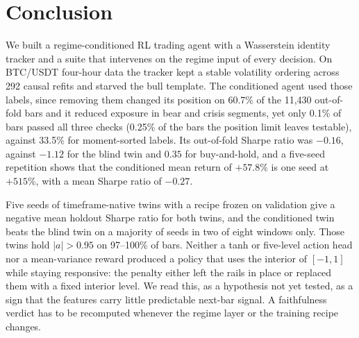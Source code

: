 \documentclass[conference]{IEEEtran}
\begin{document}
\section{Conclusion}
We built a regime-conditioned RL trading agent with a Wasserstein identity tracker and a suite that intervenes on the regime input of every decision. On BTC/USDT four-hour data the tracker kept a stable volatility ordering across 292 causal refits and starved the bull template. The conditioned agent used those labels, since removing them changed its position on 60.7\% of the 11{,}430 out-of-fold bars and it reduced exposure in bear and crisis segments, yet only 0.1\% of bars passed all three checks (0.25\% of the bars the position limit leaves testable), against 33.5\% for moment-sorted labels. Its out-of-fold Sharpe ratio was $-0.16$, against $-1.12$ for the blind twin and $0.35$ for buy-and-hold, and a five-seed repetition shows that the conditioned mean return of $+57.8\%$ is one seed at $+515\%$, with a mean Sharpe ratio of $-0.27$.

Five seeds of timeframe-native twins with a recipe frozen on validation give a negative mean holdout Sharpe ratio for both twins, and the conditioned twin beats the blind twin on a majority of seeds in two of eight windows only. Those twins hold $|a|>0.95$ on 97--100\% of bars. Neither a tanh or five-level action head nor a mean-variance reward produced a policy that uses the interior of $[-1,1]$ while staying responsive: the penalty either left the rails in place or replaced them with a fixed interior level. We read this, as a hypothesis not yet tested, as a sign that the features carry little predictable next-bar signal. A faithfulness verdict has to be recomputed whenever the regime layer or the training recipe changes.



\end{document}
